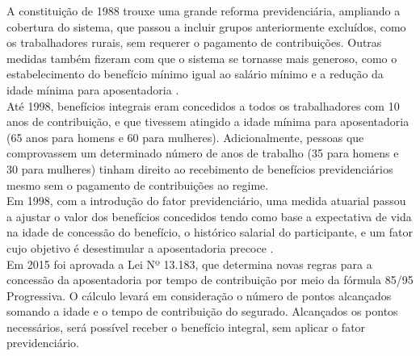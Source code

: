 \documentclass[12pt, 						%
			openright, 					%
			twoside,					%
			a4paper,x					%
			english,					%
			brazil]{abntex2}				%
\begin{document}
	A constituição de 1988 trouxe uma grande reforma previdenciária, ampliando a cobertura do sistema, que passou a  incluir grupos anteriormente excluídos, como os trabalhadores rurais, sem requerer o pagamento de contribuições. Outras medidas também fizeram com que o sistema se tornasse mais generoso, como o estabelecimento do benefício mínimo igual ao salário mínimo e a redução da idade mínima para aposentadoria \cite{stephanes1998reforma}. \\
	Até 1998, benefícios integrais eram concedidos a todos os trabalhadores com 10 anos de contribuição, e que tivessem atingido a idade mínima para aposentadoria (65 anos para homens e 60 para mulheres). Adicionalmente, pessoas que comprovassem um determinado número de anos de trabalho (35 para homens e 30 para mulheres) tinham direito ao recebimento de benefícios previdenciários mesmo sem o pagamento de contribuições ao regime. \\
	Em 1998, com a introdução do fator previdenciário, uma medida atuarial passou a ajustar o valor dos benefícios concedidos tendo como base a expectativa de vida na idade de concessão do benefício, o histórico salarial do participante, e um fator cujo objetivo é desestimular a aposentadoria precoce \cite{queiroz_figoli}. \\
	Em 2015 foi aprovada a Lei Nº 13.183, que determina novas regras para a concessão da aposentadoria por tempo de contribuição por meio da fórmula 85/95 Progressiva. O cálculo levará em consideração o número de pontos alcançados somando a idade e o tempo de contribuição do segurado. Alcançados os pontos necessários, será possível receber o benefício integral, sem aplicar o fator previdenciário.
\end{document}
